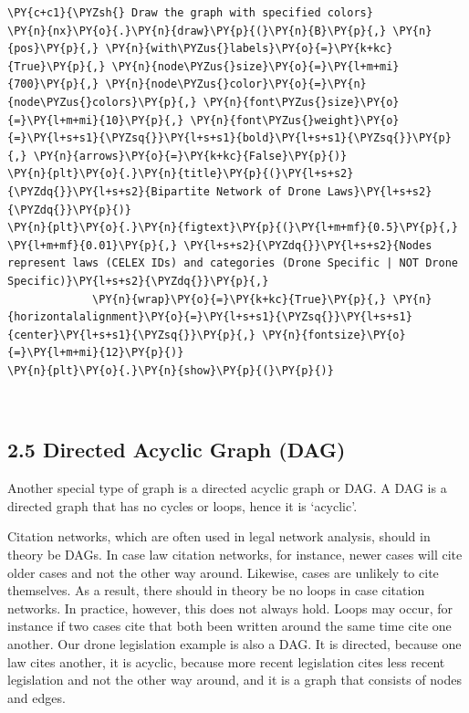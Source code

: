 \begin{tcolorbox}[breakable, size=fbox, boxrule=1pt, pad at break*=1mm,colback=cellbackground, colframe=cellborder]
\begin{Verbatim}[commandchars=\\\{\}]
\PY{c+c1}{\PYZsh{} Draw the graph with specified colors}
\PY{n}{nx}\PY{o}{.}\PY{n}{draw}\PY{p}{(}\PY{n}{B}\PY{p}{,} \PY{n}{pos}\PY{p}{,} \PY{n}{with\PYZus{}labels}\PY{o}{=}\PY{k+kc}{True}\PY{p}{,} \PY{n}{node\PYZus{}size}\PY{o}{=}\PY{l+m+mi}{700}\PY{p}{,} \PY{n}{node\PYZus{}color}\PY{o}{=}\PY{n}{node\PYZus{}colors}\PY{p}{,} \PY{n}{font\PYZus{}size}\PY{o}{=}\PY{l+m+mi}{10}\PY{p}{,} \PY{n}{font\PYZus{}weight}\PY{o}{=}\PY{l+s+s1}{\PYZsq{}}\PY{l+s+s1}{bold}\PY{l+s+s1}{\PYZsq{}}\PY{p}{,} \PY{n}{arrows}\PY{o}{=}\PY{k+kc}{False}\PY{p}{)}
\PY{n}{plt}\PY{o}{.}\PY{n}{title}\PY{p}{(}\PY{l+s+s2}{\PYZdq{}}\PY{l+s+s2}{Bipartite Network of Drone Laws}\PY{l+s+s2}{\PYZdq{}}\PY{p}{)}
\PY{n}{plt}\PY{o}{.}\PY{n}{figtext}\PY{p}{(}\PY{l+m+mf}{0.5}\PY{p}{,} \PY{l+m+mf}{0.01}\PY{p}{,} \PY{l+s+s2}{\PYZdq{}}\PY{l+s+s2}{Nodes represent laws (CELEX IDs) and categories (Drone Specific | NOT Drone Specific)}\PY{l+s+s2}{\PYZdq{}}\PY{p}{,} 
             \PY{n}{wrap}\PY{o}{=}\PY{k+kc}{True}\PY{p}{,} \PY{n}{horizontalalignment}\PY{o}{=}\PY{l+s+s1}{\PYZsq{}}\PY{l+s+s1}{center}\PY{l+s+s1}{\PYZsq{}}\PY{p}{,} \PY{n}{fontsize}\PY{o}{=}\PY{l+m+mi}{12}\PY{p}{)}
\PY{n}{plt}\PY{o}{.}\PY{n}{show}\PY{p}{(}\PY{p}{)}
\end{Verbatim}
\end{tcolorbox}

    \begin{center}
    \end{center}
    { \hspace*{\fill} \\}
    
    \hypertarget{directed-acyclic-graph-dag}{%
\subsection{2.5 Directed Acyclic Graph
(DAG)}\label{directed-acyclic-graph-dag}}

Another special type of graph is a directed acyclic graph or DAG. A DAG
is a directed graph that has no cycles or loops, hence it is `acyclic'.

Citation networks, which are often used in legal network analysis,
should in theory be DAGs. In case law citation networks, for instance,
newer cases will cite older cases and not the other way around.
Likewise, cases are unlikely to cite themselves. As a result, there
should in theory be no loops in case citation networks. In practice,
however, this does not always hold. Loops may occur, for instance if two
cases cite that both been written around the same time cite one another.
Our drone legislation example is also a DAG. It is directed, because one
law cites another, it is acyclic, because more recent legislation cites
less recent legislation and not the other way around, and it is a graph
that consists of nodes and edges.

